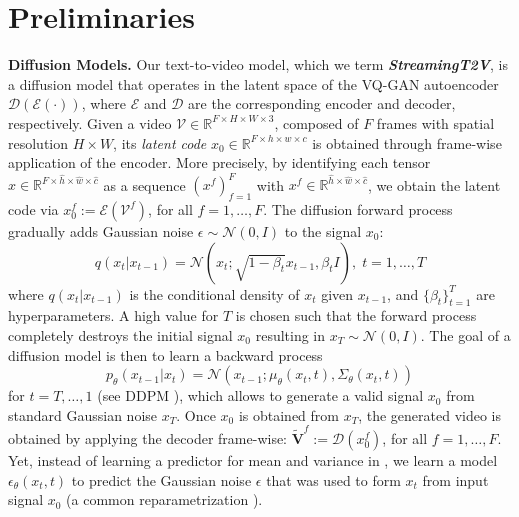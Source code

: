 \section{Preliminaries}
\label{ssec:preliminary}

\noindent\textbf{Diffusion Models.}
Our text-to-video model, which we term \textbf{\textit{StreamingT2V}}, is a diffusion model that operates in the latent space of the VQ-GAN \cite{VQ_GAN_paper,VQ_VAE_paper} autoencoder $\mathcal{D}(\mathcal{E}(\cdot))$, where $\mathcal{E}$ and $\mathcal{D}$ are the corresponding encoder and decoder, respectively. 
Given a video $\mathcal{V} \in \mathbb{R}^{F \times H \times W \times 3}$, composed of $F$ frames with spatial resolution $H \times W$, its \textit{latent code} $x_{0} \in \mathbb{R}^{F \times h \times w \times c}$ is obtained through frame-wise application of the encoder. More precisely, by identifying each tensor $x \in \mathbb{R}^{F \times \hat{h} \times \hat{w} \times \hat{c}}$ as a sequence $(x^{f})_{f=1}^{F}$ with $x^{f} \in \mathbb{R}^{ \hat{h} \times \hat{w} \times \hat{c}}$, we  obtain the latent code via $x_{0}^{f} := \mathcal{E}(\mathcal{V}^{f})$, for all $f = 1,\ldots,F$. The diffusion forward process gradually adds Gaussian noise $\epsilon \sim \mathcal{N}(0,I)$ to the signal $x_0$:
\begin{equation}
    q(x_t|x_{t-1}) = \mathcal{N}(x_t; \sqrt{1-\beta_t}x_{t-1}, \beta_t I), \;
    t = 1,\ldots,T
    \label{eqn:forward-diffusion}
\end{equation}
where $q(x_t|x_{t-1})$ is the conditional density of $x_t$ given $x_{t-1}$, and $\{\beta_t\}_{t=1}^{T}$ are hyperparameters.  A high value for $T$ is chosen such that the forward process completely destroys the initial signal $x_0$ resulting in $x_T \sim \mathcal{N}(0,I)$.
The goal of a diffusion model is then to learn a backward process
\begin{equation}
    p_\theta(x_{t-1}|x_t) = \mathcal{N}(x_{t-1};\mu_\theta(x_t,t),\Sigma_\theta(x_t,t))
    \label{eqn:diffusion-backward-process}
\end{equation}
for $t=T,\ldots,1$ (see DDPM \cite{DDPM_paper}), 
which allows to generate a valid signal $x_0$ from standard Gaussian noise $x_T$. 
Once $x_{0}$ is obtained from $x_{T}$, the generated video is obtained by applying the decoder frame-wise: $  \widetilde{\mathbf{V}}^{f} := \mathcal{D}(x_{0}^{f})$, for all $f =1,\ldots, F$.
Yet, instead of learning a predictor for mean and variance in , we  learn a model $\epsilon_{\theta}(x_t,t)$ to predict the Gaussian noise $\epsilon$ that was used to form $x_t$ from input signal $x_0$ (a  common reparametrization \cite{DDPM_paper}).

